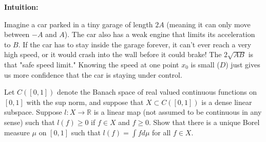 \begin{solution}
\textbf{Intuition:}

Imagine a car parked in a tiny garage of length $2A$ (meaning it can only move between $-A$ and $A$). The car also has a weak engine that limits its acceleration to $B$. If the car has to stay inside the garage forever, it can't ever reach a very high speed, or it would crash into the wall before it could brake! The $2\sqrt{AB}$ is that "safe speed limit." Knowing the speed at one point $x_0$ is small ($D$) just gives us more confidence that the car is staying under control.
\end{solution}

\begin{exercise}
\label{analysis:2011:5}
Let $C([0, 1])$ denote the Banach space of real valued continuous functions on $[0, 1]$ with the sup norm, and suppose that $X \subset C([0, 1])$ is a dense linear subspace. Suppose $l : X \to \mathbb{R}$ is a linear map (not assumed to be continuous in any sense) such that $l(f) \geq 0$ if $f \in X$ and $f \geq 0$. Show that there is a unique Borel measure $\mu$ on $[0, 1]$ such that $l(f) = \int f d\mu$ for all $f \in X$.
\end{exercise}

